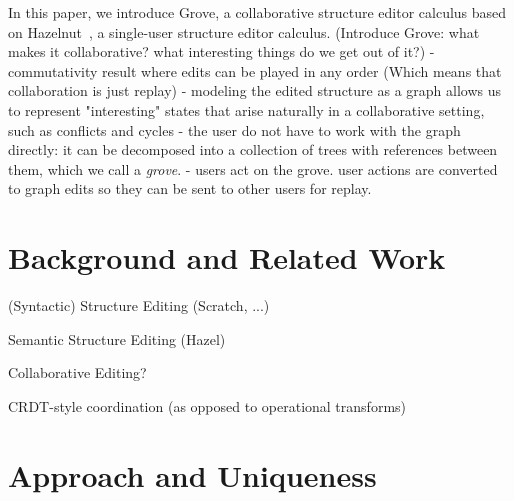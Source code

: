 \documentclass[nonacm, acmsmall, screen, review]{acmart}
\begin{document}
In this paper, we introduce Grove, a collaborative structure editor calculus based on Hazelnut~\cite{?}, a single-user structure editor calculus.
(Introduce Grove: what makes it collaborative? what interesting things do we get out of it?)
- commutativity result where edits can be played in any order (Which means that collaboration is just replay)
- modeling the edited structure as a graph allows us to represent "interesting" states that arise naturally in a collaborative setting, such as conflicts and cycles
- the user do not have to work with the graph directly: it can be decomposed into a collection of trees with references between them, which we call a \emph{grove}.
- users act on the grove. user actions are converted to graph edits so they can be sent to other users for replay.







\section{Background and Related Work}

(Syntactic) Structure Editing (Scratch, ...)

Semantic Structure Editing (Hazel)

Collaborative Editing?

CRDT-style coordination (as opposed to operational transforms)

\section{Approach and Uniqueness}
\end{document}
